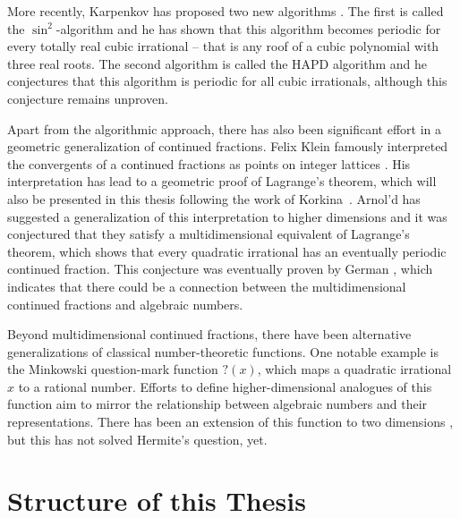 More recently, Karpenkov has proposed two new algorithms \cite{Karpenkov21, Karpenkov24}.
The first is called the $\sin^2$-algorithm and he has shown that this algorithm
becomes periodic for every totally real cubic irrational -- that is any roof of
a cubic polynomial with three real roots.
The second algorithm is called the HAPD algorithm \cite{Karpenkov24} and he
conjectures that this algorithm is periodic for all cubic irrationals,
although this conjecture remains unproven.

Apart from the algorithmic approach,
there has also been significant effort in a geometric generalization of
continued fractions.
Felix Klein famously interpreted the convergents of a continued fractions as
points on integer lattices \cite{Klein95}.
His interpretation has lead to a geometric proof of Lagrange’s theorem, which
will also be presented in this thesis following the work of Korkina~\cite{Korkina96}.
Arnol'd has suggested a generalization of this interpretation to higher
dimensions \cite{Arnold98} and it was conjectured that they satisfy a
multidimensional equivalent of Lagrange's theorem,
which shows that every quadratic irrational has an eventually periodic
continued fraction.
This conjecture was eventually proven by German \cite{German08},
which indicates that there could be a connection between the multidimensional
continued fractions and algebraic numbers.

Beyond multidimensional continued fractions, there have been alternative
generalizations of classical number-theoretic functions.
One notable example is the Minkowski question-mark function $?(x)$,
which maps a quadratic irrational $x$ to a rational number.
Efforts to define higher-dimensional analogues of this function aim to mirror
the relationship between algebraic numbers and their representations.
There has been an extension of this function to two dimensions \cite{Beaver04},
but this has not solved Hermite's question, yet.

\section{Structure of this Thesis}
\label{sec:structure}

